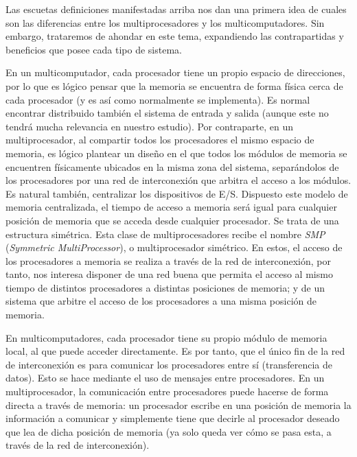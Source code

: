 Las escuetas definiciones manifestadas arriba nos dan una primera idea de cuales son las diferencias entre los multiprocesadores y los multicomputadores. Sin embargo, trataremos de ahondar en este tema, expandiendo las contrapartidas y beneficios que posee cada tipo de sistema.

En un multicomputador, cada procesador tiene un propio espacio de direcciones, por lo que es lógico pensar que la memoria se encuentra de forma física cerca de cada procesador (y es así como normalmente se implementa). Es normal encontrar distribuido también el sistema de entrada y salida (aunque este no tendrá mucha relevancia en nuestro estudio). Por contraparte, en un multiprocesador, al compartir todos los procesadores el mismo espacio de memoria, es lógico plantear un diseño en el que todos los módulos de memoria se encuentren físicamente ubicados en la misma zona del sistema, separándolos de los procesadores por una red de interconexión que arbitra el acceso a los módulos. Es natural también, centralizar los dispositivos de E/S. Dispuesto este modelo de memoria centralizada, el tiempo de acceso a memoria será igual para cualquier posición de memoria que se acceda desde cualquier procesador. Se trata de una estructura simétrica. Esta clase de multiprocesadores recibe el nombre \emph{SMP} (\emph{Symmetric MultiProcessor}), o multiprocesador simétrico. En estos, el acceso de los procesadores a memoria se realiza a través de la red de interconexión, por tanto, nos interesa disponer de una red buena que permita el acceso al mismo tiempo de distintos procesadores a distintas posiciones de memoria; y de un sistema que arbitre el acceso de los procesadores a una misma posición de memoria.

En multicomputadores, cada procesador tiene su propio módulo de memoria local, al que puede acceder directamente. Es por tanto, que el único fin de la red de interconexión es para comunicar los procesadores entre sí (transferencia de datos). Esto se hace mediante el uso de mensajes entre procesadores. En un multiprocesador, la comunicación entre procesadores puede hacerse de forma directa a través de memoria: un procesador escribe en una posición de memoria la información a comunicar y simplemente tiene que decirle al procesador deseado que lea de dicha posición de memoria (ya solo queda ver cómo se pasa esta, a través de la red de interconexión).

